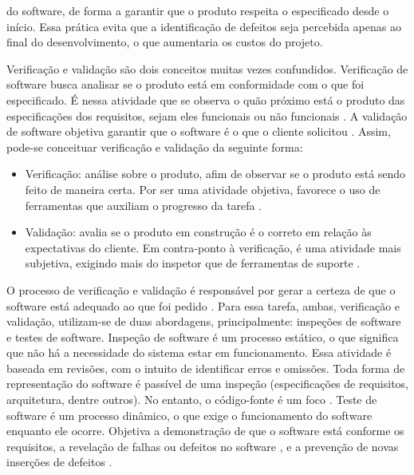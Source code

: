 do software, de forma a garantir que o produto respeita o especificado desde o
início. Essa prática evita que a identificação de defeitos seja percebida
apenas ao final do desenvolvimento, o que aumentaria os custos do projeto.
\par
\indent Verificação e validação são dois conceitos muitas vezes confundidos.
Verificação de software busca analisar se o produto está em conformidade com o
que foi especificado. É nessa atividade que se observa o quão próximo está o
produto das especificações dos requisitos, sejam eles funcionais ou não
funcionais \cite{sommerville2007}. A validação de software objetiva garantir
que o software é o que o cliente solicitou \cite{sommerville2007}. Assim,
pode-se conceituar verificação e validação da seguinte forma:
\begin{itemize}
\item Verificação: análise sobre o produto, afim de observar se o produto está
sendo feito de maneira certa. Por ser uma atividade objetiva, favorece o uso de
ferramentas que auxiliam o progresso da tarefa \cite{sayao2007}.
\item Validação: avalia se o produto em construção é o correto em relação às
expectativas do cliente. Em contra-ponto à verificação, é uma atividade mais
subjetiva, exigindo mais do inspetor que de ferramentas de suporte
\cite{sayao2007}.
\end{itemize}
\par
\indent O processo de verificação e validação é responsável por gerar a certeza
de que o software está adequado ao que foi pedido \cite{sommerville2007}. Para
essa tarefa, ambas, verificação e validação, utilizam-se de duas abordagens,
principalmente: inspeções de software e testes de software. Inspeção de
software é um processo estático, o que significa que não há a necessidade do
sistema estar em funcionamento. Essa atividade é baseada em revisões, com o
intuito de identificar erros e omissões. Toda forma de representação do
software é passível de uma inspeção (especificações de requisitos, arquitetura,
dentre outros). No entanto, o código-fonte é um foco \cite{sommerville2007}.
Teste de software é um processo dinâmico, o que exige o funcionamento do
software enquanto ele ocorre. Objetiva a demonstração de que o software está
conforme os requisitos, a revelação de falhas ou defeitos no software
\cite{sommerville2007}, e a prevenção de novas inserções de defeitos
\cite{burkeCoyner2003}.

